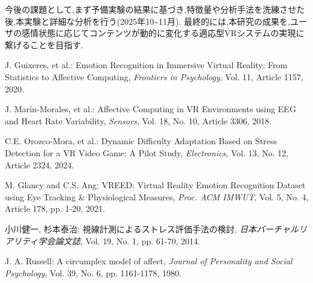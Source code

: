 \documentclass[a4paper]{jlreq}
\begin{document}
今後の課題として,まず予備実験の結果に基づき,特徴量や分析手法を洗練させた後,本実験と詳細な分析を行う(2025年10\textasciitilde11月). 最終的には,本研究の成果を,ユーザの感情状態に応じてコンテンツが動的に変化する適応型VRシステムの実現に繋げることを目指す.

\begin{thebibliography}{99}

J. Guixeres, et al.: Emotion Recognition in Immersive Virtual Reality: From Statistics to Affective Computing, \textit{Frontiers in Psychology}, Vol. 11, Article 1157, 2020.
    
J. Marín-Morales, et al.: Affective Computing in VR Environments using EEG and Heart Rate Variability, \textit{Sensors}, Vol. 18, No. 10, Article 3306, 2018.
    
C.E. Orozco-Mora, et al.: Dynamic Difficulty Adaptation Based on Stress Detection for a VR Video Game: A Pilot Study, \textit{Electronics}, Vol. 13, No. 12, Article 2324, 2024.
    
M. Glancy and C.S. Ang: VREED: Virtual Reality Emotion Recognition Dataset using Eye Tracking \& Physiological Measures, \textit{Proc. ACM IMWUT}, Vol. 5, No. 4, Article 178, pp. 1-20, 2021.

小川健一, 杉本泰治: 視線計測によるストレス評価手法の検討, \textit{日本バーチャルリアリティ学会論文誌}, Vol. 19, No. 1, pp. 61-70, 2014. 

J. A. Russell: A circumplex model of affect, \textit{Journal of Personality and Social Psychology}, Vol. 39, No. 6, pp. 1161-1178, 1980.

\end{thebibliography}
\end{document}
